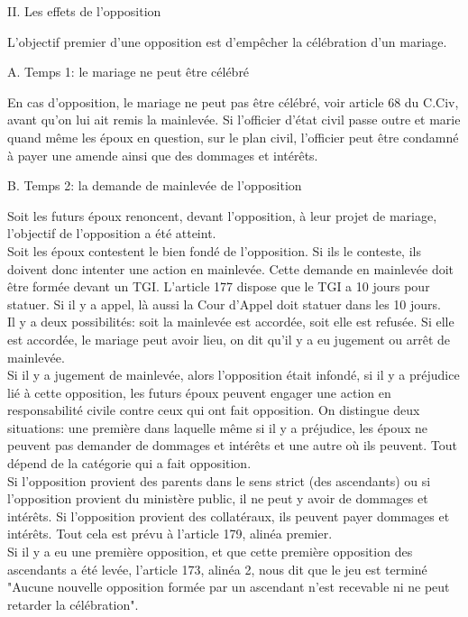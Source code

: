 \documentclass[12pt, a4paper, openany]{book}
\begin{document}
II. Les effets de l'opposition


L'objectif premier d'une opposition est d'empêcher la célébration d'un mariage. 


A. Temps 1: le mariage ne peut être célébré


En cas d'opposition, le mariage ne peut pas être célébré, voir article 68 du C.Civ, avant qu'on lui ait remis la mainlevée. Si l'officier d'état civil passe outre et marie quand même les époux en question, sur le plan civil, l'officier peut être condamné à payer une amende ainsi que des dommages et intérêts. 


B. Temps 2: la demande de mainlevée de l'opposition


Soit les futurs époux renoncent, devant l'opposition, à leur projet de mariage, l'objectif de l'opposition a été atteint. \\
Soit les époux contestent le bien fondé de l'opposition. Si ils le conteste, ils doivent donc intenter une action en mainlevée. Cette demande en mainlevée doit être formée devant un TGI. L'article 177 dispose que le TGI a 10 jours pour statuer. Si il y a appel, là aussi la Cour d'Appel doit statuer dans les 10 jours. \\
Il y a deux possibilités: soit la mainlevée est accordée, soit elle est refusée. Si elle est accordée, le mariage peut avoir lieu, on dit qu'il y a eu jugement ou arrêt de mainlevée. \\
Si il y a jugement de mainlevée, alors l'opposition était infondé, si il y a préjudice lié à cette opposition, les futurs époux peuvent engager une action en responsabilité civile contre ceux qui ont fait opposition. On distingue deux situations: une première dans laquelle même si il y a préjudice, les époux ne peuvent pas demander de dommages et intérêts et une autre où ils peuvent. Tout dépend de la catégorie qui a fait opposition. \\
Si l'opposition provient des parents dans le sens strict (des ascendants) ou si l'opposition provient du ministère public, il ne peut y avoir de dommages et intérêts. Si l'opposition provient des collatéraux, ils peuvent payer dommages et intérêts. Tout cela est prévu à l'article 179, alinéa premier. \\
Si il y a eu une première opposition, et que cette première opposition des ascendants a été levée, l'article 173, alinéa 2, nous dit que le jeu est terminé "Aucune nouvelle opposition formée par un ascendant n'est recevable ni ne peut retarder la célébration". 
\end{document}

